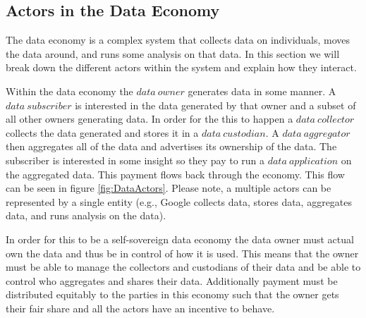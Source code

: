 \subsection{Actors in the Data Economy}
\label{section:Actors}

The data economy is a complex system that collects data on individuals, moves the data around, and runs some analysis on that data. In this section we will break down the different actors within the system and explain how they interact.


Within the data economy the $data\ owner$ generates data in some manner. A $data\ subscriber$ is interested in the data generated by that owner and a subset of all other owners generating data. In order for the this to happen a $data\ collector$ collects the data generated and stores it in a $data\ custodian$. A $data\ aggregator$ then aggregates all of the data and advertises its ownership of the data. The subscriber is interested in some insight so they pay to run a $data\ application$ on the aggregated data. This payment flows back through the economy. This flow can be seen in figure \ref{fig:DataActors}.  Please note, a multiple actors can be represented by a single entity (e.g., Google collects data, stores data, aggregates data, and runs analysis on the data).

In order for this to be a self-sovereign data economy the data owner must actual own the data and thus be in control of how it is used. This means that the owner must be able to manage the collectors and custodians of their data and be able to control who aggregates and shares their data. Additionally payment must be distributed equitably to the parties in this economy such that the owner gets their fair share and all the actors have an incentive to behave.

